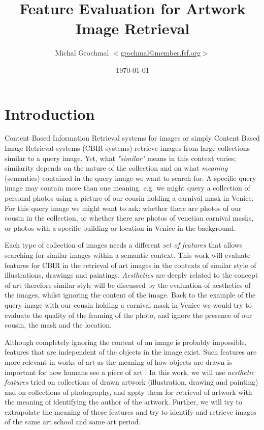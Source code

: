 \documentclass[a4paper]{article}
\title{Feature Evaluation for Artwork Image Retrieval}
\author{Michal Grochmal
  $<$\href{mailto:grochmal@member.fsf.org}{grochmal@member.fsf.org}$>$
}
\date{\today}
\begin{document}
\maketitle

\section{Introduction}

Content Based Information Retrieval systems for images or simply Content Based
Image Retrieval systems (CBIR systems) retrieve images from large collections
similar to a query image.  Yet, what \emph{"similar"} means in this context
varies;  similarity depends on the nature of the collection and on what
\emph{meaning} (semantics) contained in the query image we want to search for.
A specific query image may contain more than one meaning.  e.g. we might query
a collection of personal photos using a picture of our cousin holding a
carnival mask in Venice.  For this query image we might want to ask: whether
there are photos of our cousin in the collection, or whether there are photos
of venetian carnival masks, or photos with a specific building or location in
Venice in the background.

Each type of collection of images needs a different \emph{set of features} that
allows searching for similar images within a semantic context.  This work will
evaluate features for CBIR in the retrieval of art images in the contexts of
similar style of illustrations, drawings and paintings.  \emph{Aesthetics} are
deeply related to the concept of art \cite{rmc12ajs} therefore similar style
will be discussed by the evaluation of aesthetics of the images, whilst
ignoring the content of the image.  Back to the example of the query image with
our cousin holding a carnival mask in Venice we would try to evaluate the
quality of the framing of the photo, and ignore the presence of our cousin, the
mask and the location.

Although completely ignoring the content of an image is probably impossible,
features that are independent of the objects in the image exist.  Such features
are more relevant in works of art \cite{zirnhelt07art} as the meaning of how
objects are drawn is important for how humans see a piece of art
\cite{mach10clas}.  In this work, we will use \emph{aesthetic features} tried
on collections of drawn artwork (illustration, drawing and painting) and on
collections of photography, and apply them for retrieval of artwork with the
meaning of identifying the author of the artwork.  Further, we will try to
extrapolate the meaning of these features and try to identify and retrieve
images of the same art school and same art period.
\end{document}
